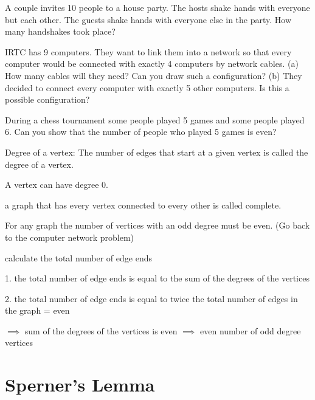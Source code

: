\documentclass[a4paper,12pt]{article}
\begin{document}
A couple invites 10 people to a house party. The hosts shake hands with everyone but each other. The guests shake hands with everyone else in the party. How many handshakes took place?

IRTC has 9 computers. They want to link them into a network so that every computer would be connected with exactly 4 computers by network cables.
(a) How many cables will they need? Can you draw such a configuration?
(b) They decided to connect every computer with exactly 5 other computers. Is this a possible configuration?


During a chess tournament some people played 5 games and some people played 6. Can you show that the number of people who played 5 games is even?

Degree of a vertex: The number of edges that start at a given vertex is called the degree of a vertex.


A vertex can have degree 0.

a graph that has every vertex connected to every other is called complete.

For any graph the number of vertices with an odd degree must be even. (Go back to the computer network problem)

calculate the total number of edge ends 

1. the total number of edge ends is equal to the sum of the degrees of the vertices

2. the total number of edge ends is equal to twice the total number of edges in the graph = even

$\implies$ sum of the degrees of the vertices is even
$\implies$ even number of odd degree vertices

\section{Sperner's Lemma}
\end{document}
